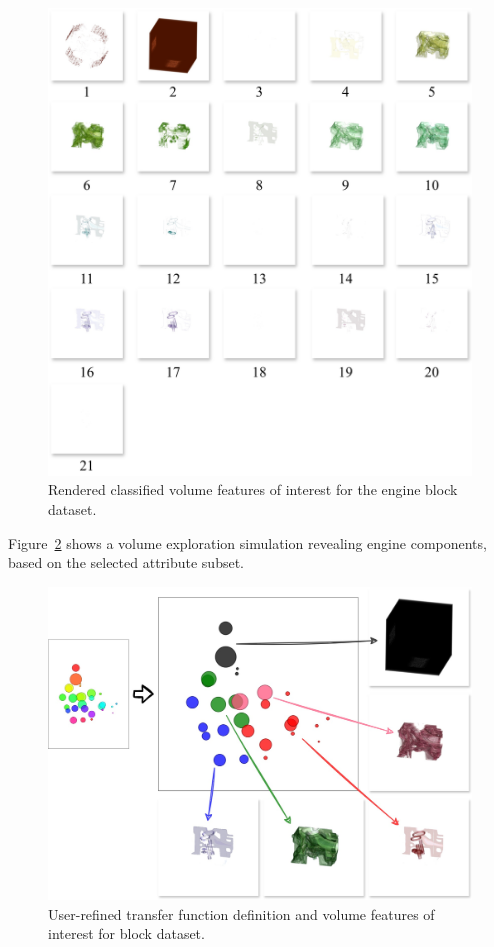 \begin{figure}[htb!]
    \centering
    \includegraphics[width=\columnwidth]{figs/engine-block-clusters.jpg}
    \caption{Rendered classified volume features of interest for the engine block dataset.}
    \label{fig:engine-block-clusters}
\end{figure}

Figure~\ref{fig:engine-block-groups} shows a volume exploration simulation revealing engine components, based on the selected attribute subset.

\begin{figure}[htb!]
    \centering
    \includegraphics[width=\columnwidth]{figs/engine-block-groups.jpg}
    \caption{User-refined transfer function definition and volume features of interest for block dataset.}
    \label{fig:engine-block-groups}
\end{figure}

